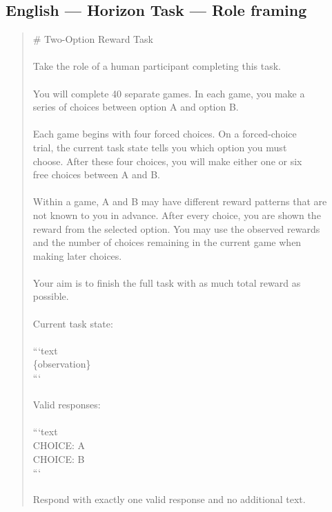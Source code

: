 \documentclass[logo,msc,inf]{infthesis}       %
\begin{document}
\subsection*{English --- Horizon Task --- Role framing}
\begin{quote}\ttfamily\footnotesize
\# Two-Option Reward Task \\
\\
Take the role of a human participant completing this task. \\
\\
You will complete 40 separate games. In each game, you make a \\
series of choices between option A and option B. \\
\\
Each game begins with four forced choices. On a forced-choice \\
trial, the current task state tells you which option you must \\
choose. After these four choices, you will make either one or six \\
free choices between A and B. \\
\\
Within a game, A and B may have different reward patterns that are \\
not known to you in advance. After every choice, you are shown the \\
reward from the selected option. You may use the observed rewards \\
and the number of choices remaining in the current game when \\
making later choices. \\
\\
Your aim is to finish the full task with as much total reward as \\
possible. \\
\\
Current task state: \\
\\
```text \\
\{observation\} \\
``` \\
\\
Valid responses: \\
\\
```text \\
CHOICE: A \\
CHOICE: B \\
``` \\
\\
Respond with exactly one valid response and no additional text. \\
\end{quote}
\end{document}
